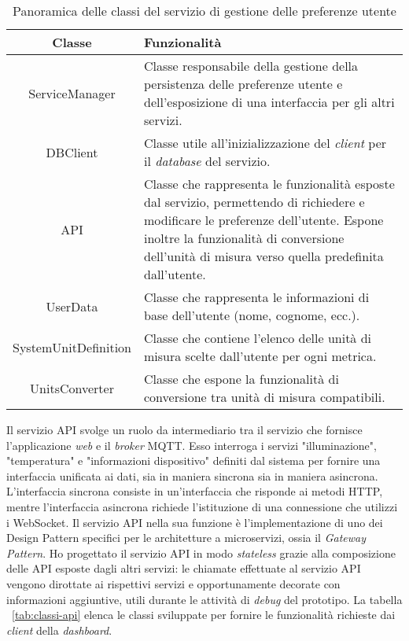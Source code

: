 \begin{table}[!h]
\caption{Panoramica delle classi del servizio di gestione delle preferenze utente}
\label{tab:classi-user}
\begin{tabularx}{\linewidth}{|c|X|}
\hline
\textbf{Classe} & \textbf{Funzionalità} \\
\hline
ServiceManager & Classe responsabile della gestione della persistenza delle preferenze utente e dell'esposizione di una interfaccia per gli altri servizi. \\
\hline
DBClient & Classe utile all'inizializzazione del \emph{client} per il \emph{database} del servizio. \\
\hline
API & Classe che rappresenta le funzionalità esposte dal servizio, permettendo di richiedere e modificare le preferenze dell'utente. Espone inoltre la funzionalità di conversione dell'unità di misura verso quella predefinita dall'utente. \\
\hline
UserData & Classe che rappresenta le informazioni di base dell'utente (nome, cognome, ecc.). \\
\hline
SystemUnitDefinition & Classe che contiene l'elenco delle unità di misura scelte dall'utente per ogni metrica. \\
\hline
UnitsConverter & Classe che espone la funzionalità di conversione tra unità di misura compatibili. \\
\hline
\end{tabularx}
\end{table}


Il servizio API svolge un ruolo da intermediario tra il servizio che fornisce l'applicazione \emph{web} e il \emph{broker} MQTT.
Esso interroga i servizi "illuminazione", "temperatura" e "informazioni dispositivo"  definiti dal sistema per fornire una interfaccia unificata ai dati, sia in maniera sincrona sia in maniera asincrona.
L'interfaccia sincrona consiste in un'interfaccia che risponde ai metodi HTTP, mentre l'interfaccia asincrona richiede l'istituzione di una connessione che utilizzi i WebSocket.
Il servizio API nella sua funzione è l'implementazione di uno dei Design Pattern specifici per le architetture a microservizi, ossia il \emph{Gateway Pattern}.
Ho progettato il servizio API in modo \emph{stateless} grazie alla composizione delle API esposte dagli altri servizi: le chiamate effettuate al servizio API vengono dirottate ai rispettivi servizi e opportunamente decorate con informazioni aggiuntive, utili durante le attività di \emph{debug} del prototipo.
La tabella ~\ref{tab:classi-api} elenca le classi sviluppate per fornire le funzionalità richieste dai \emph{client} della \emph{dashboard}.

